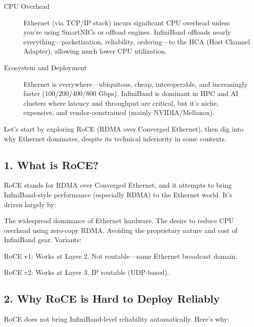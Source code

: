 \begin{description}
\item [CPU Overhead]
Ethernet (via TCP/IP stack) incurs significant CPU overhead unless you’re using SmartNICs or offload engines.
InfiniBand offloads nearly everything—packetization, reliability, ordering—to the HCA (Host Channel Adapter), allowing much lower CPU utilization.

\item [Ecosystem and Deployment]
Ethernet is everywhere—ubiquitous, cheap, interoperable, and increasingly faster (100/200/400/800 Gbps).
InfiniBand is dominant in HPC and AI clusters where latency and throughput are critical, but it's niche, expensive, and vendor-constrained (mainly NVIDIA/Mellanox).
 
 \end{description}
 
 
 
 Let’s start by exploring RoCE (RDMA over Converged Ethernet), then dig into why Ethernet dominates, despite its technical inferiority in some contexts.
 
 

\subsection{1. What is RoCE?}

RoCE stands for RDMA over Converged Ethernet, and it attempts to bring InfiniBand-style performance (especially RDMA) to the Ethernet world. It’s driven largely by:

The widespread dominance of Ethernet hardware.
The desire to reduce CPU overhead using zero-copy RDMA.
Avoiding the proprietary nature and cost of InfiniBand gear.
Variants:

RoCE v1: Works at Layer 2. Not routable—same Ethernet broadcast domain.

RoCE v2: Works at Layer 3. IP routable (UDP-based).

\subsection{2. Why RoCE is Hard to Deploy Reliably}

RoCE does not bring InfiniBand-level reliability automatically. Here's why:

